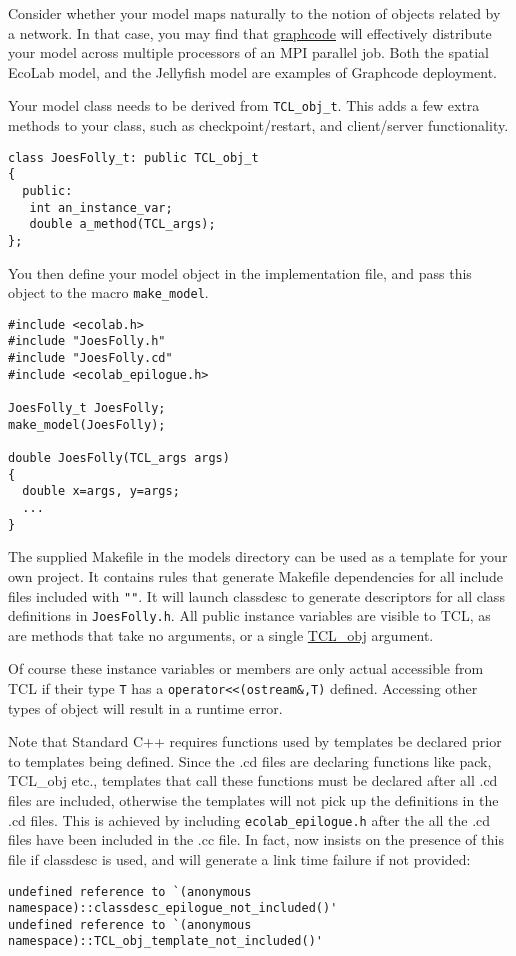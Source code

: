 Consider whether your model maps naturally to the notion of objects
related by a network. In that case, you may find that
\hyperref{Graphcode}{Graphcode (\S}{)}{graphcode}
will effectively distribute your model across multiple processors of
an MPI parallel job. Both the spatial EcoLab model, and the Jellyfish
model are examples of Graphcode deployment.

Your model class needs to be derived from \verb+TCL_obj_t+. This adds
a few extra methods to your class, such as checkpoint/restart, and
client/server functionality.

\begin{verbatim}
class JoesFolly_t: public TCL_obj_t
{
  public:
   int an_instance_var;
   double a_method(TCL_args);
};
\end{verbatim}

You then define your model object in the implementation file, and pass
this object to the macro \verb+make_model+.

\begin{verbatim}
#include <ecolab.h>
#include "JoesFolly.h"
#include "JoesFolly.cd"
#include <ecolab_epilogue.h>

JoesFolly_t JoesFolly;
make_model(JoesFolly);

double JoesFolly(TCL_args args)
{
  double x=args, y=args;
  ...
}
\end{verbatim}

The supplied Makefile in the models directory can be used as a
template for your own project. It contains rules that generate
Makefile dependencies for all include files included with
\verb+""+. It will launch classdesc to generate descriptors for all
class definitions in \verb+JoesFolly.h+. All public instance variables
are visible to TCL, as are methods that take no arguments, or a single
\hyperref{TCL\_args}{TCL\_args (\S}{)}{TCL_obj} argument.

Of course these instance variables or members are only actual accessible from
TCL if their type \verb+T+ has a \verb+operator<<(ostream&,T)+
defined. Accessing other types of object will result in a runtime error.

Note that Standard C++ requires functions used by templates be
declared prior to templates being defined. Since the .cd files are
declaring functions like pack, TCL\_obj etc., templates that call
these functions must be declared after all .cd files are included,
otherwise the templates will not pick up the definitions in the .cd
files. This is achieved by including
\verb+ecolab_epilogue.h+ after the all the
.cd files have been included in the .cc file. In fact, now \EcoLab{}
insists on the presence of this file if classdesc is used, and will
generate a link time failure if not provided:
\begin{verbatim}
undefined reference to `(anonymous namespace)::classdesc_epilogue_not_included()'
undefined reference to `(anonymous namespace)::TCL_obj_template_not_included()'
\end{verbatim}

